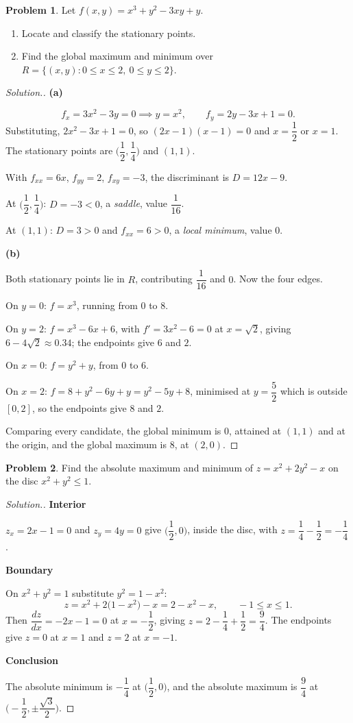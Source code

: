 \documentclass[11pt,a4paper]{article}
\theoremstyle{definition}
\newtheorem{problemx}{Problem}[subsection]
\newenvironment{problem}{\begin{problemx}}{\end{problemx}}
\newenvironment{solution}
  {\renewcommand{\qedsymbol}{}\begin{proof}[\textit{Solution}.]}
  {\end{proof}}
\newcommand{\subhead}[1]{%
  \par\medskip\noindent\textbf{#1}\par\nobreak\smallskip}
\begin{document}
\begin{problem}
Let $f(x,y) = x^3+y^2-3xy+y$.
\begin{enumerate}
\item[(a)] Locate and classify the stationary points.
\item[(b)] Find the global maximum and minimum over
$R = \{(x,y): 0\leq x\leq 2,\ 0\leq y\leq 2\}$.
\end{enumerate}
\end{problem}
\begin{solution}
\subhead{(a)}
$$f_x = 3x^2-3y = 0 \implies y = x^2,\qquad
f_y = 2y-3x+1 = 0 .$$
Substituting, $2x^2-3x+1 = 0$, so $(2x-1)(x-1) = 0$ and
$x = \dfrac12$ or $x = 1$. The stationary points are
$\Big(\dfrac12,\dfrac14\Big)$ and $(1,1)$.

With $f_{xx} = 6x$, $f_{yy} = 2$, $f_{xy} = -3$, the discriminant is
$D = 12x-9$.

At $\Big(\dfrac12,\dfrac14\Big)$: $D = -3<0$, a \emph{saddle}, value
$\dfrac{1}{16}$.

At $(1,1)$: $D = 3>0$ and $f_{xx} = 6>0$, a \emph{local minimum}, value $0$.

\subhead{(b)}
Both stationary points lie in $R$, contributing $\dfrac{1}{16}$ and $0$. Now the
four edges.

On $y=0$: $f = x^3$, running from $0$ to $8$.

On $y=2$: $f = x^3-6x+6$, with $f' = 3x^2-6 = 0$ at $x = \sqrt2$, giving
$6-4\sqrt2\approx 0.34$; the endpoints give $6$ and $2$.

On $x=0$: $f = y^2+y$, from $0$ to $6$.

On $x=2$: $f = 8+y^2-6y+y = y^2-5y+8$, minimised at $y = \dfrac52$ which is
outside $[0,2]$, so the endpoints give $8$ and $2$.

Comparing every candidate, the global minimum is $0$, attained at $(1,1)$ and at
the origin, and the global maximum is $8$, at $(2,0)$.
\end{solution}

\begin{problem}
Find the absolute maximum and minimum of $z = x^2+2y^2-x$ on the disc
$x^2+y^2\leq 1$.
\end{problem}
\begin{solution}
\subhead{Interior}
$z_x = 2x-1 = 0$ and $z_y = 4y = 0$ give $\Big(\dfrac12, 0\Big)$, inside the
disc, with $z = \dfrac14-\dfrac12 = -\dfrac14$.

\subhead{Boundary}
On $x^2+y^2 = 1$ substitute $y^2 = 1-x^2$:
$$z = x^2+2\big(1-x^2\big)-x = 2-x^2-x ,\qquad -1\leq x\leq 1 .$$
Then $\dfrac{dz}{dx} = -2x-1 = 0$ at $x = -\dfrac12$, giving
$z = 2-\dfrac14+\dfrac12 = \dfrac94$. The endpoints give $z = 0$ at $x=1$ and
$z = 2$ at $x=-1$.

\subhead{Conclusion}
The absolute minimum is $-\dfrac14$ at $\Big(\dfrac12,0\Big)$, and the absolute
maximum is $\dfrac94$ at $\Big(-\dfrac12, \pm\dfrac{\sqrt3}{2}\Big)$.
\end{solution}
\end{document}
